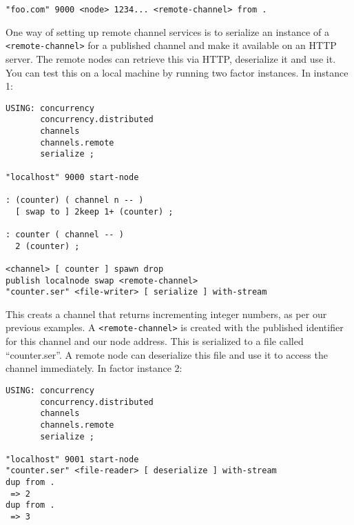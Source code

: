 \begin{verbatim}
"foo.com" 9000 <node> 1234... <remote-channel> from .
\end{verbatim}

One way of setting up remote channel services is to serialize an instance of a \texttt{<remote-channel>} for a published channel and make it available on an HTTP server. The remote nodes can retrieve this via HTTP, deserialize it and use it. You can test this on a local machine by running two factor instances. In instance 1:

\begin{verbatim}
USING: concurrency 
       concurrency.distributed 
       channels 
       channels.remote 
       serialize ;

"localhost" 9000 start-node 

: (counter) ( channel n -- )
  [ swap to ] 2keep 1+ (counter) ;
    
: counter ( channel -- )
  2 (counter) ;    

<channel> [ counter ] spawn drop 
publish localnode swap <remote-channel>
"counter.ser" <file-writer> [ serialize ] with-stream
\end{verbatim}

This creats a channel that returns incrementing integer numbers, as per our previous examples. A \texttt{<remote-channel>} is created with the published identifier for this channel and our node address. This is serialized to a file called ``counter.ser''. A remote node can deserialize this file and use it to access the channel immediately. In factor instance 2:

\begin{verbatim}
USING: concurrency 
       concurrency.distributed 
       channels 
       channels.remote 
       serialize ;

"localhost" 9001 start-node 
"counter.ser" <file-reader> [ deserialize ] with-stream
dup from .
 => 2
dup from .
 => 3
\end{verbatim}

